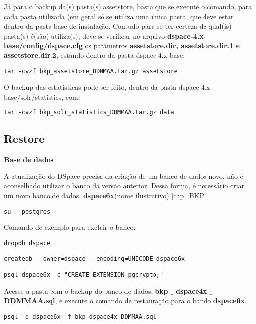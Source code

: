 \documentclass[12pt,hidelinks]{article}
\begin{document}
Já para o backup da(s) pasta(s) assetstore, basta que se execute o comando, para cada pasta utilizada (em geral só se utiliza uma única pasta, que deve estar dentro da pasta base de instalação. Contudo para se ter certeza de qual(is) pasta(s) é(são) utiliza(s), deve-se verificar no arquivo \textbf{dspace-4.x-base/config/dspace.cfg} os parâmetros \textbf{assetstore.dir, assetstore.dir.1 e assetstore.dir.2}, estando dentro da pasta dspace-4.x-base:   

\begin{verbatim}
tar -cvzf bkp_assetstore_DDMMAA.tar.gz assetstore
\end{verbatim}

O backup das estatísticas pode ser feito, dentro da pasta dspace-4.x-base/solr/statistics, com:

\begin{verbatim}
tar -cvzf bkp_solr_statistics_DDMMAA.tar.gz data
\end{verbatim}

\subsection{Restore}

\textbf{Base de dados}
\singlespacing

A atualização do DSpace precisa da criação de um banco de dados novo, não é aconselhado utilizar o banco da versão anterior. Dessa forma, é necessário criar um novo banco de dados, \textbf{dspace6x}(nome ilustrativo) \ref{cap_BKP} 


\begin{verbatim}
su - postgres
\end{verbatim}

Comando de exemplo para excluir o banco:
\begin{verbatim}
dropdb dspace
\end{verbatim}

\begin{verbatim}
createdb --owner=dspace --encoding=UNICODE dspace6x

psql dspace6x -c "CREATE EXTENSION pgcrypto;"
\end{verbatim}

\newpage



Acesse a pasta com o backup do banco de dados, \textbf{bkp $\_$ dspace4x $\_$ DDMMAA.sql}, e execute o comando de restauração para o bando \textbf{dspace6x}.


\begin{verbatim}
psql -d dspace6x -f bkp_dspace4x_DDMMAA.sql
\end{verbatim}
\end{document}
